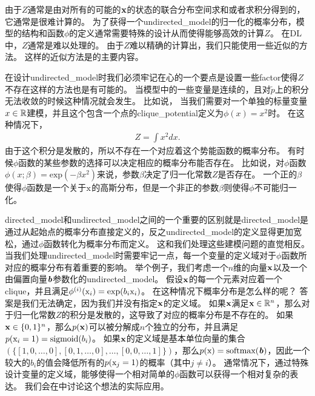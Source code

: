 由于$Z$通常是由对所有的可能的$\mathbf{x}$的状态的联合分布空间求和或者求积分得到的，它通常是很难计算的。
为了获得一个\gls{undirected_model}的归一化的概率分布，模型的结构和函数$\phi$的定义通常需要特殊的设计从而使得能够高效的计算$Z$。
在\gls{DL}中，$Z$通常是难以处理的。
由于$Z$难以精确的计算出，我们只能使用一些近似的方法。
这样的近似方法是的主要内容。



在设计\gls{undirected_model}时我们必须牢记在心的一个要点是设置一些\gls{factor}使得$Z$不存在这样的方法也是有可能的。
当模型中的一些变量是连续的，且对$\tilde{p}$上的积分无法收敛的时候这种情况就会发生。
比如说， 当我们需要对一个单独的标量变量$x\in\mathbb{R}$建模，并且这个包含一个点的\gls{clique_potential}定义为$\phi(x) = x^2$时。
在这种情况下，
\begin{align}
Z = \int x^2 dx.
\end{align}
由于这个积分是发散的，所以不存在一个对应着这个势能函数的概率分布。
有时候$\phi$函数的某些参数的选择可以决定相应的概率分布能否存在。
比如说，对$\phi$函数$\phi(x;\beta) = \text{exp}(-\beta x^2)$来说，参数$\beta$决定了归一化常数$Z$是否存在。
一个正的$\beta$使得$\phi$函数是一个关于$\mathrm{x}$的高斯分布，但是一个非正的参数$\beta$则使得$\phi$不可能归一化。


\gls{directed_model}和\gls{undirected_model}之间的一个重要的区别就是\gls{directed_model}是通过从起始点的概率分布直接定义的，反之\gls{undirected_model}的定义显得更加宽松，通过$\phi$函数转化为概率分布而定义。
这和我们处理这些建模问题的直觉相反。
当我们处理\gls{undirected_model}时需要牢记一点，每一个变量的定义域对于$\phi$函数所对应的概率分布有着重要的影响。
举个例子，我们考虑一个$n$维的向量$\mathbf{x}$以及一个由偏置向量$\boldsymbol{\mathit{b}}$参数化的\gls{undirected_model}。
假设$\mathbf{x}$的每一个元素对应着一个\gls{clique}，并且满足$\phi^{(i)}(\mathrm{x}_i) = \exp(b_i\mathrm{x}_i)$。
在这种情况下概率分布是怎么样的呢？
答案是我们无法确定，因为我们并没有指定$\mathbf{x}$的定义域。
如果$\mathbf{x}$满足$\mathbf{x} \in \mathbb{R}^n$，那么对于归一化常数$Z$的积分是发散的，这导致了对应的概率分布是不存在的。
如果$\mathbf{x}\in\{0,1\}^n$，那么$p(\mathbf{x})$可以被分解成$n$个独立的分布，并且满足$p(\mathrm{x}_i=1) = \text{sigmoid}(b_i)$。
如果$\mathbf{x}$的定义域是基本单位向量的集合$(\{[1,0,\ldots,0],[0,1,\ldots,0],\ldots,[0,0,\ldots,1]\})$，那么$p(\mathrm{x}) = \text{softmax}(\boldsymbol{\mathit{b}})$，因此一个较大的$b_i$的值会降低所有的$p(\mathrm{x}_j = 1)$的概率（其中$j\neq i$）。
通常情况下，通过特殊设计变量的定义域，能够使得一个相对简单的$\phi$函数可以获得一个相对复杂的表达。
我们会在中讨论这个想法的实际应用。


